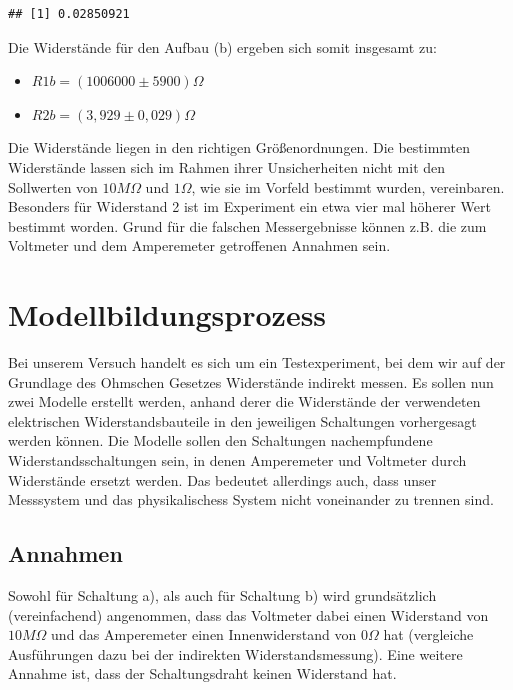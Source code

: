 \documentclass[class=article, crop=false]{standalone}
\begin{document}
\begin{verbatim}
## [1] 0.02850921
\end{verbatim}

Die Widerstände für den Aufbau (b) ergeben sich somit insgesamt zu:

\begin{itemize}
\item $R1b = (1006000\pm 5900)\Omega $
\item $R2b = (3,929\pm 0,029) \Omega$
\end{itemize}

Die Widerstände liegen in den richtigen Größenordnungen. Die bestimmten
Widerstände lassen sich im Rahmen ihrer Unsicherheiten nicht mit den
Sollwerten von \(10M\Omega\) und \(1\Omega\), wie sie im Vorfeld
bestimmt wurden, vereinbaren. Besonders für Widerstand 2 ist im
Experiment ein etwa vier mal höherer Wert bestimmt worden. Grund für die
falschen Messergebnisse können z.B. die zum Voltmeter und dem
Amperemeter getroffenen Annahmen sein.

\hypertarget{modellbildungsprozess}{%
\section{Modellbildungsprozess}\label{modellbildungsprozess}}

Bei unserem Versuch handelt es sich um ein Testexperiment, bei dem wir
auf der Grundlage des Ohmschen Gesetzes Widerstände indirekt messen. Es
sollen nun zwei Modelle erstellt werden, anhand derer die Widerstände
der verwendeten elektrischen Widerstandsbauteile in den jeweiligen
Schaltungen vorhergesagt werden können. Die Modelle sollen den
Schaltungen nachempfundene Widerstandsschaltungen sein, in denen
Amperemeter und Voltmeter durch Widerstände ersetzt werden. Das bedeutet
allerdings auch, dass unser Messsystem und das physikalischess System
nicht voneinander zu trennen sind.

\hypertarget{annahmen}{%
\subsection{Annahmen}\label{annahmen}}

Sowohl für Schaltung a), als auch für Schaltung b) wird grundsätzlich
(vereinfachend) angenommen, dass das Voltmeter dabei einen Widerstand
von \(10M\Omega\) und das Amperemeter einen Innenwiderstand von
\(0\Omega\) hat (vergleiche Ausführungen dazu bei der indirekten
Widerstandsmessung). Eine weitere Annahme ist, dass der Schaltungsdraht
keinen Widerstand hat.
\end{document}
